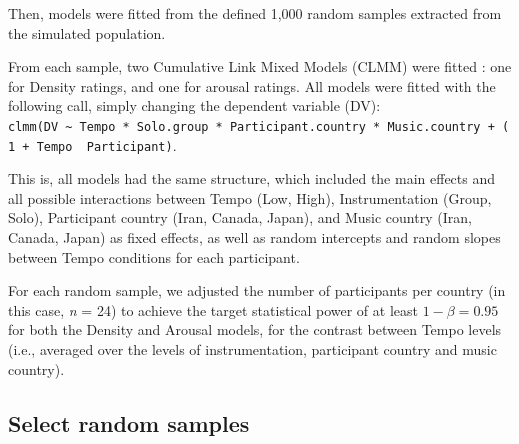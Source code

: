 \documentclass[
  bookmarksnumbered]{article}
\begin{document}
Then, models were fitted from the defined 1,000 random samples extracted from the simulated population.

From each sample, two Cumulative Link Mixed Models (CLMM) were fitted \autocite[see e.g.,][]{taylorRatingNormsShould2022}: one for Density ratings, and one for arousal ratings. All models were fitted with the following call, simply changing the dependent variable (DV): \texttt{clmm(DV\ \textasciitilde{}\ Tempo\ *\ Solo.group\ *\ Participant.country\ *\ Music.country\ +\ (1\ +\ Tempo\ \textbar{}\ Participant)}.

This is, all models had the same structure, which included the main effects and all possible interactions between Tempo (Low, High), Instrumentation (Group, Solo), Participant country (Iran, Canada, Japan), and Music country (Iran, Canada, Japan) as fixed effects, as well as random intercepts and random slopes between Tempo conditions for each participant.

For each random sample, we adjusted the number of participants per country (in this case, \emph{n} = 24) to achieve the target statistical power of at least \(1 - \beta = 0.95\) for both the Density and Arousal models, for the contrast between Tempo levels (i.e., averaged over the levels of instrumentation, participant country and music country).

\hypertarget{select-random-samples}{%
\subsection{Select random samples}\label{select-random-samples}}
\end{document}
